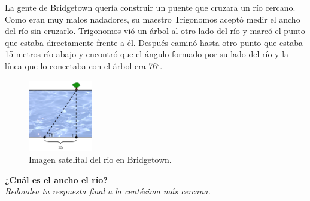 \question[25]  La gente de Bridgetown quería construir un puente que cruzara un río cercano.
Como eran muy malos nadadores, su maestro Trigonomos aceptó medir el ancho del río sin cruzarlo.
Trigonomos vió un árbol al otro lado del río y marcó el punto que estaba directamente frente a él.
Después caminó hasta otro punto que estaba 15 metros río abajo y encontró que el ángulo formado
por su lado del río y la línea que lo conectaba con el árbol era 76$^\circ$.\\
\begin{figure}[H]
    \begin{center}
        \includegraphics[width=0.25\textwidth]{../images/river2.png}
    \end{center}
    \caption{Imagen satelital del rio en Bridgetown.}
    \label{fig:river2}
\end{figure}
\textbf{¿Cuál es el ancho el río?}\\
\textit{Redondea tu respuesta final a la centésima más cercana.}